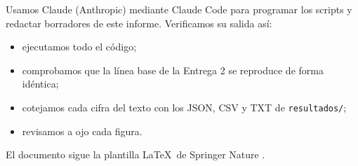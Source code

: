 \documentclass[pdflatex,sn-mathphys-num]{sn-jnl}%
\theoremstyle{thmstyleone}%
\theoremstyle{thmstyletwo}%
\theoremstyle{thmstylethree}%
\begin{document}
\FloatBarrier
\backmatter


Usamos Claude (Anthropic) \cite{anthropic2026claude} mediante Claude Code para programar los scripts y redactar borradores de este informe. Verificamos su salida así:
\begin{itemize}
\item ejecutamos todo el código;
\item comprobamos que la línea base de la Entrega 2 se reproduce de forma idéntica;
\item cotejamos cada cifra del texto con los JSON, CSV y TXT de \texttt{resultados/};
\item revisamos a ojo cada figura.
\end{itemize}
El documento sigue la plantilla \LaTeX\ de Springer Nature \cite{springer2024latex}.


\end{document}
